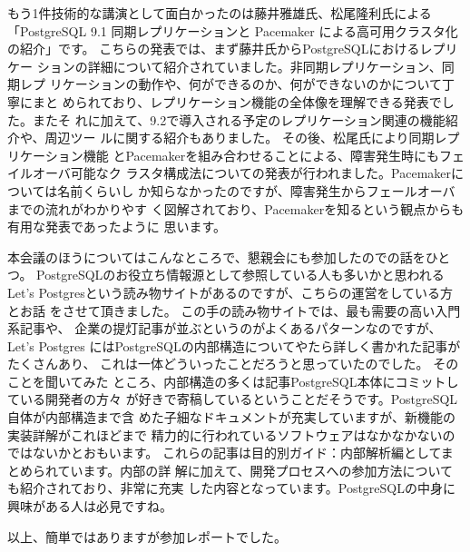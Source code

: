もう1件技術的な講演として面白かったのは藤井雅雄氏、松尾隆利氏による
「PostgreSQL 9.1 同期レプリケーションと Pacemaker による高可用クラスタ化
の紹介」です。 こちらの発表では、まず藤井氏からPostgreSQLにおけるレプリケー
ションの詳細について紹介されていました。非同期レプリケーション、同期レプ
リケーションの動作や、何ができるのか、何ができないのかについて丁寧にまと
められており、レプリケーション機能の全体像を理解できる発表でした。またそ
れに加えて、9.2で導入される予定のレプリケーション関連の機能紹介や、周辺ツー
ルに関する紹介もありました。 その後、松尾氏により同期レプリケーション機能
とPacemakerを組み合わせることによる、障害発生時にもフェイルオーバ可能なク
ラスタ構成法についての発表が行われました。Pacemakerについては名前くらいし
か知らなかったのですが、障害発生からフェールオーバまでの流れがわかりやす
く図解されており、Pacemakerを知るという観点からも有用な発表であったように
思います。

本会議のほうについてはこんなところで、懇親会にも参加したのでの話をひとつ。
PostgreSQLのお役立ち情報源として参照している人も多いかと思われるLet's
Postgresという読み物サイトがあるのですが、こちらの運営をしている方とお話
をさせて頂きました。 この手の読み物サイトでは、最も需要の高い入門系記事や、
企業の提灯記事が並ぶというのがよくあるパターンなのですが、Let's Postgres
にはPostgreSQLの内部構造についてやたら詳しく書かれた記事がたくさんあり、
これは一体どういったことだろうと思っていたのでした。 そのことを聞いてみた
ところ、内部構造の多くは記事PostgreSQL本体にコミットしている開発者の方々
が好きで寄稿しているということだそうです。PostgreSQL自体が内部構造まで含
めた子細なドキュメントが充実していますが、新機能の実装詳解がこれほどまで
精力的に行われているソフトウェアはなかなかないのではないかとおもいます。
これらの記事は目的別ガイド：内部解析編としてまとめられています。内部の詳
解に加えて、開発プロセスへの参加方法についても紹介されており、非常に充実
した内容となっています。PostgreSQLの中身に興味がある人は必見ですね。

以上、簡単ではありますが参加レポートでした。

